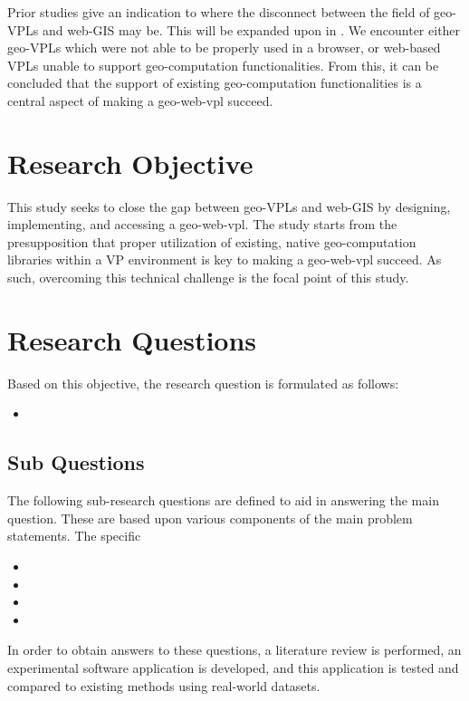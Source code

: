 Prior studies give an indication to where the disconnect between the field of geo-VPLs and web-GIS may be. This will be expanded upon in .
We encounter either geo-VPLs which were not able to be properly used in a browser, or web-based VPLs unable to support geo-computation functionalities. From this, it can be concluded that the support of existing geo-computation functionalities is a central aspect of making a geo-web-vpl succeed. 


\section{Research Objective}
This study seeks to close the gap between geo-VPLs and web-GIS by designing, implementing, and accessing a geo-web-vpl.
The study starts from the presupposition that proper utilization of existing, native geo-computation libraries within a VP environment is key to making a geo-web-vpl succeed. 
As such, overcoming this technical challenge is the focal point of this study. 

\section{Research Questions}
Based on this objective, the research question is formulated as follows: 
\begin{itemize}[ ]
  \item \myMainRQ
\end{itemize}

\subsection*{Sub Questions}
The following sub-research questions are defined to aid in answering the main question.
These are based upon various components of the main problem statements. 
The specific 
\begin{itemize}[-]
  \item \mySubRQOne
  \item \mySubRQTwo
  \item \mySubRQThree
  \item \mySubRQFour
\end{itemize}
In order to obtain answers to these questions, a literature review is performed,
an experimental software application is developed, 
and this application is tested and compared to existing methods using real-world datasets.


